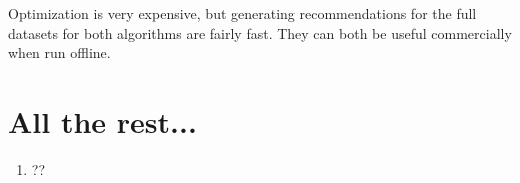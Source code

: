 Optimization is very expensive, but generating recommendations for the full datasets for both algorithms are fairly fast. They can both be useful commercially when run offline.


\section{All the rest...}

\begin{enumerate}
    \item ??
\end{enumerate}




